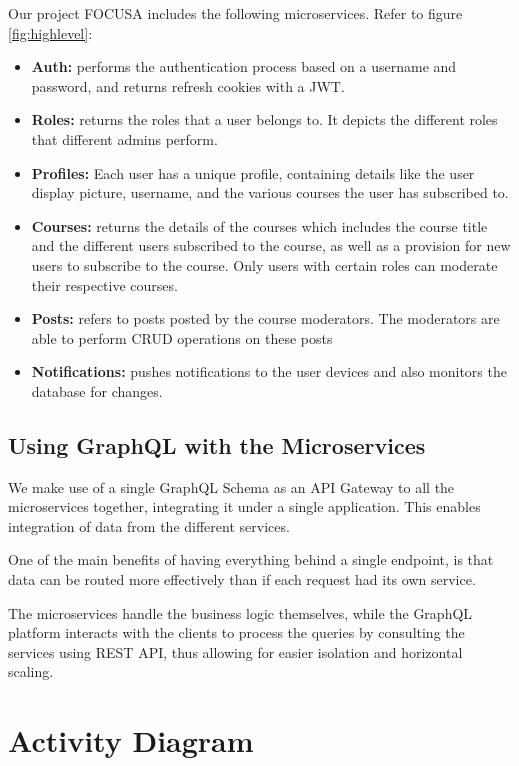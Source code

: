 Our project FOCUSA includes the following microservices. Refer to figure \ref{fig:highlevel}:
\begin{itemize}
    \item \textbf{Auth:} performs the authentication process based on a username and password, and returns refresh cookies with a JWT.
    \item \textbf{Roles:}  returns the roles that a user belongs to. It depicts the different roles that different admins perform.
    \item \textbf{Profiles:} Each user has a unique profile, containing details like the user display picture, username, and the various courses the user has subscribed to.
    \item \textbf{Courses:}  returns the details of the courses which includes the course title and the different users subscribed to the course, as well as a provision for new users to subscribe to the course. Only users with certain roles can moderate their respective courses.
    \item \textbf{Posts:} refers to posts posted by the course moderators. The moderators are able to perform CRUD operations on these posts
    \item \textbf{Notifications:}  pushes notifications to the user devices and also monitors the database for changes.
\end{itemize}

\subsection{Using GraphQL with the Microservices}

We make  use of a single GraphQL Schema as an API Gateway to all the microservices together, 
integrating it under a single application. This enables integration of data from the different services.

One of the main benefits of having everything behind a single endpoint, is that data can be routed more 
effectively than if each request had its own service. 

The microservices handle the business logic themselves, while the GraphQL platform interacts with the 
clients to process the queries by consulting the services using REST API, thus allowing for easier isolation 
and horizontal scaling.

\section{Activity Diagram}

